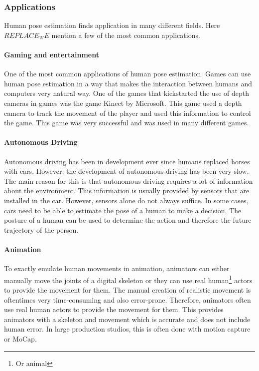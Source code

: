 \subsubsection{Applications}

Human pose estimation finds application in many different fields. Here $REPLACE_WE$ mention a few of the most common applications.

\paragraph{Gaming and entertainment}

One of the most common applications of human pose estimation. Games can use human pose estimation in a way that makes the interaction between humans and computers very natural way. One of the games that kickstarted the use of depth cameras in games was the game Kinect by Microsoft. This game used a depth camera to track the movement of the player and used this information to control the game. This game was very successful and was used in many different games. 

\paragraph{Autonomous Driving}

Autonomous driving has been in development ever since humans replaced horses with cars\cite{OldAutoDrive}. However, the development of autonomous driving has been very slow. The main reason for this is that autonomous driving requires a lot of information about the environment. This information is usually provided by sensors that are installed in the car. However, sensors alone do not always suffice. In some cases, cars need to be able to estimate the pose of a human to make a decision. The posture of a human can be used to determine the action and therefore the future trajectory of the person. 

\paragraph{Animation}

To exactly emulate human movements in animation, animators can either manually move the joints of a digital skeleton or they can use real human\footnote{Or animal} actors to provide the movement for them. The manual creation of realistic movement is oftentimes very time-consuming and also error-prone. Therefore, animators often use real human actors to provide the movement for them. This provides animators with a skeleton and movement which is accurate and does not include human error. In large production studios, this is often done with motion capture or MoCap. 

